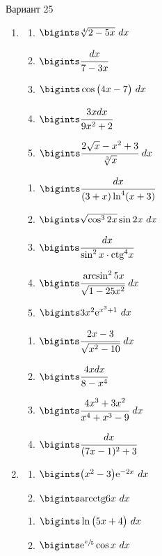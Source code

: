 \documentclass{article}
\begin{document}
\begin{multicols}{2}
\centerline{Вариант 25}
\begin{enumerate}[label=\Roman*.]
	\item
	\begin{multicols}{3}
		\begin{enumerate}[label=\arabic*.]
			\setlength\itemsep{1em}
			\item $\bigints\sqrt[4]{2-5x}\ dx$
			\item $\bigints\cfrac{dx}{7-3x}$
			\item $\bigints\cos \big( 4x-7 \big)\ dx$
			\item $\bigints\cfrac{3xdx}{9x^2+2}$
			\item $\bigints\cfrac{2\sqrt{x} - x^2+3}{\sqrt[3]{x}}\ dx$
		\end{enumerate}
		\vfill\null\columnbreak
		\begin{enumerate}[label=\arabic*. , start=6]
			\setlength\itemsep{1em}
			\item $\bigints\cfrac{dx}{(3 + x)\ln^4(x+3)}$
			\item $\bigints\sqrt{\cos^32x}\sin 2x\ dx$
			\item $\bigints\cfrac{dx}{\sin^2x \cdot \mbox{ctg}^4x}$
			\item $\bigints\cfrac{\arcsin^2 5x}{\sqrt{1-25 x^2}}\ dx$
			\item $\bigints 3x^2\mbox{e}^{x^3 + 1}\ dx$
		\end{enumerate}
		\vfill\null\columnbreak
		\begin{enumerate}[label=\arabic*. , start=11]
			\setlength\itemsep{1em}
			\item $\bigints\cfrac{2x - 3}{\sqrt{x^2 - 10}}\ dx$
			\item $\bigints\cfrac{4xdx}{8-x^4}$
			\item $\bigints\cfrac{4x^3 + 3x^2}{x^4 + x^3 - 9}\ dx$
			\item $\bigints\cfrac{dx}{(7x - 1)^2 + 3}$
		\end{enumerate}
		\vfill\null\columnbreak
	\end{multicols}

	\item
	\begin{multicols}{3}
		\begin{enumerate}[label=\arabic*.]
			\setlength\itemsep{1em}
			\item $\bigints\big(x^2 - 3\big)\mbox{e}^{-2x}\ dx$
			\item $\bigints\mbox{arcctg}6x\ dx$
		\end{enumerate}
		\vfill\null\columnbreak
		\begin{enumerate}[label=\arabic*., start=3]
			\setlength\itemsep{1em}
			\item $\bigints\ln\big(5x + 4\big)\ dx$
			\item $\bigints\mbox{e}^{\sfrac{x}{5}}\cos x\ dx$
		\end{enumerate}
		\vfill\null\columnbreak
		\vfill\null\columnbreak
	\end{multicols}


\end{enumerate}
\end{multicols}
\end{document}
